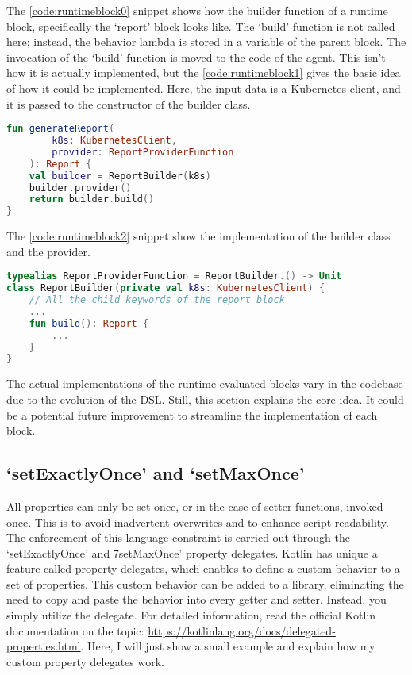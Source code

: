 The \ref{code:runtimeblock0} snippet shows how the builder function of a runtime block, specifically the `report' block looks like. The `build' function is not called here; instead, the behavior lambda is stored in a variable of the parent block. The invocation of the `build' function is moved to the code of the agent. This isn't how it is actually implemented, but the \ref{code:runtimeblock1} gives the basic idea of how it could be implemented. Here, the input data is a Kubernetes client, and it is passed to the constructor of the builder class.

\begin{lstlisting}[caption={Build a report},language=Kotlin,label=code:runtimeblock1]
fun generateReport(
        k8s: KubernetesClient, 
        provider: ReportProviderFunction
    ): Report {
    val builder = ReportBuilder(k8s)
    builder.provider()
    return builder.build()
}
\end{lstlisting}

The \ref{code:runtimeblock2} snippet show the implementation of the builder class and the provider.

\begin{lstlisting}[caption={Report builder class and provider},language=Kotlin,label=code:runtimeblock2]
typealias ReportProviderFunction = ReportBuilder.() -> Unit
class ReportBuilder(private val k8s: KubernetesClient) {
    // All the child keywords of the report block
    ...
    fun build(): Report {
        ...
    }
}
\end{lstlisting}

The actual implementations of the runtime-evaluated blocks vary in the codebase due to the evolution of the DSL. Still, this section explains the core idea. It could be a potential future improvement to streamline the implementation of each block.

\subsection{`setExactlyOnce' and `setMaxOnce'}

All properties can only be set once, or in the case of setter functions, invoked once. This is to avoid inadvertent overwrites and to enhance script readability. The enforcement of this language constraint is carried out through the `setExactlyOnce' and 7setMaxOnce' property delegates. Kotlin has unique a feature called property delegates, which enables to define a custom behavior to a set of properties. This custom behavior can be added to a library, eliminating the need to copy and paste the behavior into every getter and setter. Instead, you simply utilize the delegate. For detailed information, read the official Kotlin documentation on the topic: \url{https://kotlinlang.org/docs/delegated-properties.html}. Here, I will just show a small example and explain how my custom property delegates work.

